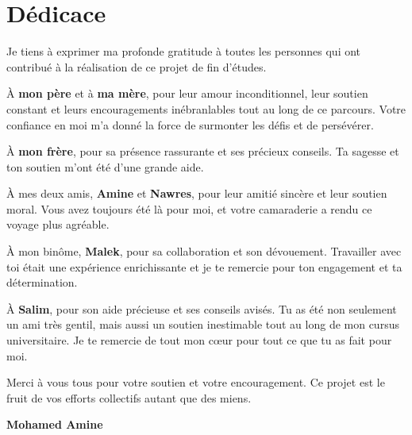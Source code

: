 \thispagestyle{empty}

\chapter*{Dédicace}

Je tiens à exprimer ma profonde gratitude à toutes les personnes qui ont contribué à la réalisation de ce projet de fin d'études.
\vspace{1em}

À \textbf{mon père} et à \textbf{ma mère}, pour leur amour inconditionnel, leur soutien constant et leurs encouragements inébranlables tout au long de ce parcours. Votre confiance en moi m'a donné la force de surmonter les défis et de persévérer.

À \textbf{mon frère}, pour sa présence rassurante et ses précieux conseils. Ta sagesse et ton soutien m'ont été d'une grande aide.

À mes deux amis, \textbf{Amine} et \textbf{Nawres}, pour leur amitié sincère et leur soutien moral. Vous avez toujours été là pour moi, et votre camaraderie a rendu ce voyage plus agréable.

À mon binôme, \textbf{Malek}, pour sa collaboration et son dévouement. Travailler avec toi était une expérience enrichissante et je te remercie pour ton engagement et ta détermination.

À \textbf{Salim}, pour son aide précieuse et ses conseils avisés. Tu as été non seulement un ami très gentil, mais aussi un soutien inestimable tout au long de mon cursus universitaire. Je te remercie de tout mon cœur pour tout ce que tu as fait pour moi.

\vspace{1em}
Merci à vous tous pour votre soutien et votre encouragement. Ce projet est le fruit de vos efforts collectifs autant que des miens.

\vfill
\hfill \textbf{Mohamed Amine}